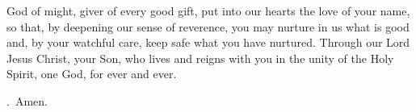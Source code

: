\lettrine[lines=3]{G}{}od of might, giver of every good gift,
put into our hearts the love of your name,
so that, by deepening our sense of reverence,
you may nurture in us what is good
and, by your watchful care,
keep safe what you have nurtured.
Through our Lord Jesus Christ, your Son,
who lives and reigns with you in the unity of the Holy Spirit,
one God, for ever and ever. \par \Rbar.~Amen.
